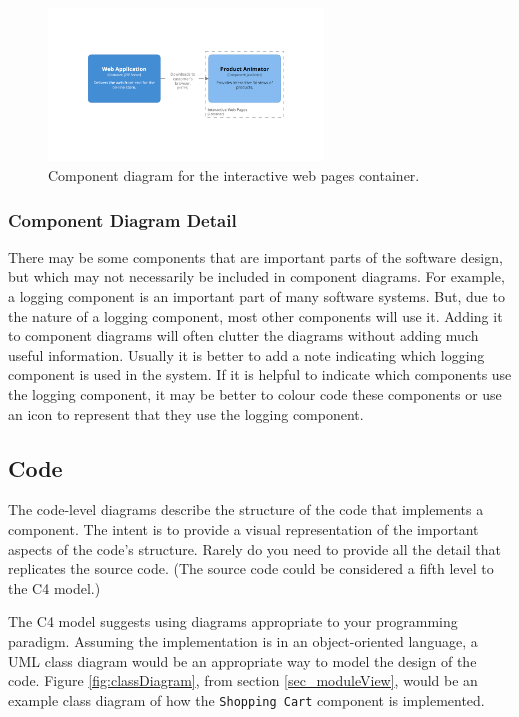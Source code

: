 \begin{figure}[h!]
    \centering
    \includegraphics[trim=245 265 245 270,clip,width=0.65\textwidth]{images/c4/browser_component_diagram.png}
    \caption{Component diagram for the interactive web pages container.}
    \label{fig:c4_component_browser}
\end{figure}

\subsubsection{Component Diagram Detail}
There may be some components that are important parts of the software design,
but which may not necessarily be included in component diagrams.
For example, a logging component is an important part of many software systems.
But, due to the nature of a logging component, most other components will use it.
Adding it to component diagrams will often clutter the diagrams without adding much useful information.
Usually it is better to add a note indicating which logging component is used in the system.
If it is helpful to indicate which components use the logging component,
it may be better to colour code these components or use an icon to represent that they use the logging component.

\subsection{Code}
The code-level diagrams describe the structure of the code that implements a component.
The intent is to provide a visual representation of the important aspects of the code's structure.
Rarely do you need to provide all the detail that replicates the source code.
(The source code could be considered a fifth level to the C4 model.)

The C4 model suggests using diagrams appropriate to your programming paradigm.
Assuming the implementation is in an object-oriented language, a UML class diagram would be an appropriate way to model the design of the code.
Figure \ref{fig:classDiagram}, from section \ref{sec_moduleView},
would be an example class diagram of how the \texttt{Shopping Cart} component is implemented.

